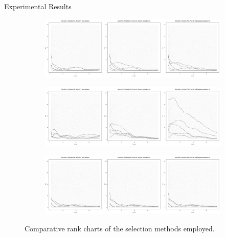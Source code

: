 \documentclass[final]{beamer}
\newlength{\twocolwid}
\begin{document}
\begin{frame}[t]
\begin{columns}[t]
\begin{column}{\twocolwid}
\begin{block}{Experimental Results}
\begin{figure}[H]
  \centering
  \begin{subfigure}[b]{0.8\columnwidth}
    \includegraphics[width=\columnwidth]{rank-score-brush-mds-p10.pdf}
  \end{subfigure}
  \begin{subfigure}[b]{0.8\columnwidth}
    \includegraphics[width=\columnwidth]{rank-score-brush-mds-p50.pdf}
  \end{subfigure}
  \begin{subfigure}[b]{0.8\columnwidth}
    \includegraphics[width=\columnwidth]{rank-score-brush-mds-p90.pdf}
  \end{subfigure}
  \caption{Comparative rank charts of the selection methods employed.}
  \label{fig:rank-plots}
\end{figure}
\end{block}


\end{column} %


\end{columns}
\end{frame}
\end{document}
